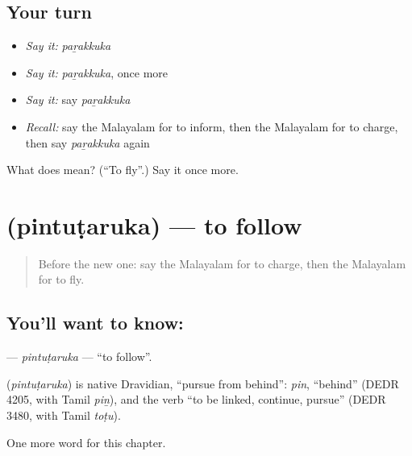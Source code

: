 \subsection*{Your turn}
\begin{itemize}
\raggedright
  \item \emph{Say it:} \emph{paṟakkuka}
  \item \emph{Say it:} \emph{paṟakkuka}, once more
  \item \emph{Say it:} say \emph{paṟakkuka}
  \item \emph{Recall:} say the Malayalam for to inform, then the Malayalam for to charge, then say \emph{paṟakkuka} again
\end{itemize}

\begin{tcolorbox}[breakable,colback=teal!4,colframe=teal!35!black,title={Before you move on}]
What does  mean? (\textquotedblleft{}To fly\textquotedblright{}.) Say it once more.
\end{tcolorbox}
\section[\texorpdfstring{\ml{പിന്തുടരുക} (pintuṭaruka)}{പിന്തുടരുക (pintuṭaruka)}]{ (pintuṭaruka) — to follow}

\label{lesson:ML-C185-pintutaruka}



\begin{quote}
Before the new one: say the Malayalam for to charge, then the Malayalam for to fly.
\end{quote}

\subsection*{You'll want to know: }
\textbf{} — \emph{pintuṭaruka} — \textquotedblleft{}to follow\textquotedblright{}.

\begin{cousinweb}
\textbf{} (\emph{pintuṭaruka}) is native Dravidian, \textquotedblleft{}pursue from behind\textquotedblright{}: \emph{pin}, \textquotedblleft{}behind\textquotedblright{} (DEDR 4205, with Tamil \emph{piṉ}), and the verb \textquotedblleft{}to be linked, continue, pursue\textquotedblright{} (DEDR 3480, with Tamil \emph{toṭu}).
\end{cousinweb}

\begin{grammarlens}[title={What you've built}]
One more word for this chapter.
\end{grammarlens}

